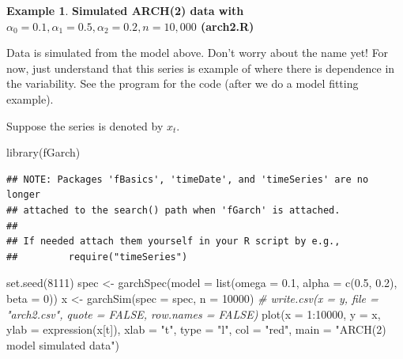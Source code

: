 \documentclass[
]{book}
\newenvironment{Shaded}{\begin{snugshade}}{\end{snugshade}}
\newcommand{\AttributeTok}[1]{\textcolor[rgb]{0.77,0.63,0.00}{#1}}
\newcommand{\CommentTok}[1]{\textcolor[rgb]{0.56,0.35,0.01}{\textit{#1}}}
\newcommand{\DecValTok}[1]{\textcolor[rgb]{0.00,0.00,0.81}{#1}}
\newcommand{\FloatTok}[1]{\textcolor[rgb]{0.00,0.00,0.81}{#1}}
\newcommand{\FunctionTok}[1]{\textcolor[rgb]{0.00,0.00,0.00}{#1}}
\newcommand{\NormalTok}[1]{#1}
\newcommand{\OtherTok}[1]{\textcolor[rgb]{0.56,0.35,0.01}{#1}}
\newcommand{\SpecialCharTok}[1]{\textcolor[rgb]{0.00,0.00,0.00}{#1}}
\newcommand{\StringTok}[1]{\textcolor[rgb]{0.31,0.60,0.02}{#1}}
\theoremstyle{definition}
\theoremstyle{definition}
\newtheorem{example}{Example}[chapter]
\theoremstyle{definition}
\theoremstyle{definition}
\theoremstyle{remark}
\begin{document}
\begin{example}
\textbf{Simulated ARCH(2) data with \(\alpha_0 = 0.1, \alpha_1 = 0.5, \alpha_2 = 0.2, n = 10,000\) (arch2.R)}

Data is simulated from the model above. Don't worry about the name yet! For now, just understand that this series is example of where there is dependence in the variability. See the program for the code (after we do a model fitting example).

Suppose the series is denoted by \(x_t\).

\begin{Shaded}
\begin{Highlighting}[]
\FunctionTok{library}\NormalTok{(fGarch)}
\end{Highlighting}
\end{Shaded}

\begin{verbatim}
## NOTE: Packages 'fBasics', 'timeDate', and 'timeSeries' are no longer
## attached to the search() path when 'fGarch' is attached.
## 
## If needed attach them yourself in your R script by e.g.,
##         require("timeSeries")
\end{verbatim}

\begin{Shaded}
\begin{Highlighting}[]
\FunctionTok{set.seed}\NormalTok{(}\DecValTok{8111}\NormalTok{)}
\NormalTok{spec }\OtherTok{\textless{}{-}} \FunctionTok{garchSpec}\NormalTok{(}\AttributeTok{model =} \FunctionTok{list}\NormalTok{(}\AttributeTok{omega =} \FloatTok{0.1}\NormalTok{, }\AttributeTok{alpha =} \FunctionTok{c}\NormalTok{(}\FloatTok{0.5}\NormalTok{, }\FloatTok{0.2}\NormalTok{), }\AttributeTok{beta =} \DecValTok{0}\NormalTok{))}
\NormalTok{x }\OtherTok{\textless{}{-}} \FunctionTok{garchSim}\NormalTok{(}\AttributeTok{spec =}\NormalTok{ spec, }\AttributeTok{n =} \DecValTok{10000}\NormalTok{)}
\CommentTok{\# write.csv(x = y, file = "arch2.csv", quote = FALSE, row.names = FALSE)}
\FunctionTok{plot}\NormalTok{(}\AttributeTok{x =} \DecValTok{1}\SpecialCharTok{:}\DecValTok{10000}\NormalTok{, }\AttributeTok{y =}\NormalTok{ x, }\AttributeTok{ylab =} \FunctionTok{expression}\NormalTok{(x[t]), }\AttributeTok{xlab =} \StringTok{"t"}\NormalTok{, }\AttributeTok{type =} \StringTok{"l"}\NormalTok{, }\AttributeTok{col =} \StringTok{"red"}\NormalTok{,}
     \AttributeTok{main =} \StringTok{"ARCH(2) model simulated data"}\NormalTok{)}
\end{Highlighting}
\end{Shaded}


\end{example}
\end{document}
